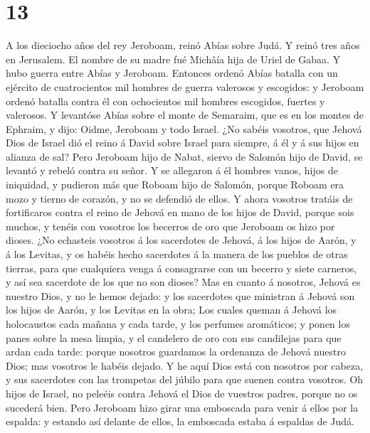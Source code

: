 \hypertarget{section-12}{%
\section{13}\label{section-12}}

 A los dieciocho años del rey Jeroboam, reinó Abías sobre
Judá.  Y reinó tres años en Jerusalem. El nombre de su madre
fué Michâía hija de Uriel de Gabaa. Y hubo guerra entre Abías y
Jeroboam.  Entonces ordenó Abías batalla con un ejército de
cuatrocientos mil hombres de guerra valerosos y escogidos: y Jeroboam
ordenó batalla contra él con ochocientos mil hombres escogidos, fuertes
y valerosos.  Y levantóse Abías sobre el monte de Semaraim,
que es en los montes de Ephraim, y dijo: Oidme, Jeroboam y todo Israel.
 ¿No sabéis vosotros, que Jehová Dios de Israel dió el reino
á David sobre Israel para siempre, á él y á sus hijos en alianza de sal?
 Pero Jeroboam hijo de Nabat, siervo de Salomón hijo de
David, se levantó y rebeló contra su señor.  Y se allegaron
á él hombres vanos, hijos de iniquidad, y pudieron más que Roboam hijo
de Salomón, porque Roboam era mozo y tierno de corazón, y no se defendió
de ellos.  Y ahora vosotros tratáis de fortificaros contra
el reino de Jehová en mano de los hijos de David, porque sois muchos, y
tenéis con vosotros los becerros de oro que Jeroboam os hizo por dioses.
 ¿No echasteis vosotros á los sacerdotes de Jehová, á los
hijos de Aarón, y á los Levitas, y os habéis hecho sacerdotes á la
manera de los pueblos de otras tierras, para que cualquiera venga á
consagrarse con un becerro y siete carneros, y así sea sacerdote de los
que no son dioses?  Mas en cuanto á nosotros, Jehová es
nuestro Dios, y no le hemos dejado: y los sacerdotes que ministran á
Jehová son los hijos de Aarón, y los Levitas en la obra; 
Los cuales queman á Jehová los holocaustos cada mañana y cada tarde, y
los perfumes aromáticos; y ponen los panes sobre la mesa limpia, y el
candelero de oro con sus candilejas para que ardan cada tarde: porque
nosotros guardamos la ordenanza de Jehová nuestro Dios; mas vosotros le
habéis dejado.  Y he aquí Dios está con nosotros por
cabeza, y sus sacerdotes con las trompetas del júbilo para que suenen
contra vosotros. Oh hijos de Israel, no peleéis contra Jehová el Dios de
vuestros padres, porque no os sucederá bien.  Pero Jeroboam
hizo girar una emboscada para venir á ellos por la espalda: y estando
así delante de ellos, la emboscada estaba á espaldas de Judá.
